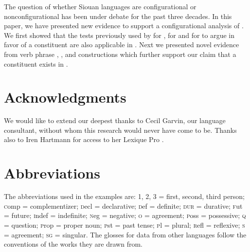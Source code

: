 \documentclass[output=paper]{LSP/langsci}
\begin{document}
The question of whether Siouan languages are configurational or nonconfigurational has been under debate for the past three decades. In this paper, we have presented new evidence to support a configurational analysis of .  We first showed that the tests previously used by \citet{Boyle2007} for , \citet{Graczyk1991a} for  and \citet{West2003} for  to argue in favor of a  constituent are also applicable in .  Next we presented novel evidence from  verb phrase , , and  constructions which further support our claim that a  constituent exists in . 

\section*{Acknowledgments}
We would like to extend our deepest thanks to Cecil Garvin, our language consultant, without whom this research would never have come to be. Thanks also to Iren Hartmann for access to her Lexique Pro .

\section*{Abbreviations}
The abbreviations used in the  examples are: 1, 2, 3 = first, second, third person; {\textsc comp} = complementizer; {\textsc decl} = declarative; {\textsc def} = definite; \textsc{dur} = durative; {\textsc fut} = future; {\textsc indef} = indefinite; {\textsc neg} = negative; {\textsc o} =  agreement; {\textsc poss} = possessive; \textsc{q} = question; {\textsc prop} = proper noun; {\textsc pst} = past tense; {\textsc pl} = plural; {\textsc refl} = reflexive; {\textsc s} =  agreement; \textsc{sg} = singular. The glosses for data from other languages follow the conventions of the works they are drawn from.
 
 

\printbibliography[heading=subbibliography,notkeyword=this]
\end{document}
